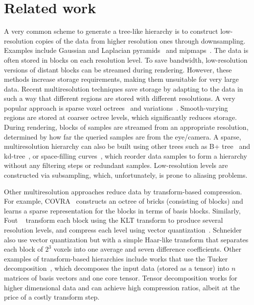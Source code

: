 \section{Related work}

A very common scheme to generate a tree-like hierarchy is to construct low-resolution copies of the
data from higher resolution ones through downsampling. Examples include Gaussian and Laplacian
pyramids~\cite{laplacian-pyramid} and
mipmaps~\cite{multires_octree1999,interactive-exploration-ct-scans}. The data is often stored in
blocks on each resolution level. To save bandwidth, low-resolution versions of distant blocks can be
streamed during rendering. However, these methods increase storage requirements, making them
unsuitable for very large data. Recent multiresolution techniques save storage by adapting to the
data in such a way that different regions are stored with different resolutions. A very popular
approach is sparse voxel octrees~\cite{gigavoxels,Gobbetti2008} and
variations~\cite{Fogal-2013-RayGuided,visualization-driven,large-scale-volume}. Smooth-varying
regions are stored at coarser octree levels, which significantly reduces storage. During rendering,
blocks of samples are streamed from an appropriate resolution, determined by how far the queried
samples are from the eye/camera. A sparse, multiresolution hierarchy can also be built using other
trees such as B+ tree~\cite{vdb2013} and kd-tree~\cite{fogal-kdtree,in-situ-sampling-particle}, or
space-filling curves~\cite{idx2001, mloc}, which reorder data samples to form a hierarchy without
any filtering steps or redundant samples. Low-resolution levels are constructed via subsampling,
which, unfortunately, is prone to aliasing problems.

Other multiresolution approaches reduce data by transform-based compression. For example,
COVRA~\cite{covra2012} constructs an octree of bricks (consisting of blocks) and learns a sparse
representation for the blocks in terms of basis blocks. Similarly, Fout \etal~\cite{hw_dvr2007}
transform each block using the KLT transform to produce several resolution levels, and compress each
level using vector quantization~\cite{vq1992}. Schneider~\etal~\cite{compression_domain2003} also
use vector quantization but with a simple Haar-like transform that separates each block of $2^3$
voxels into one average and seven difference coefficients. Other examples of transform-based
hierarchies include works that use the Tucker
decomposition~\cite{tensor_dvr2015,tamresh,tucker-thresholding,multiscale-tensor}, which decomposes
the input data (stored as a tensor) into $n$ matrices of basis vectors and one core tensor. Tensor
decomposition works for higher dimensional data and can achieve high compression ratios, albeit at
the price of a costly transform step.

